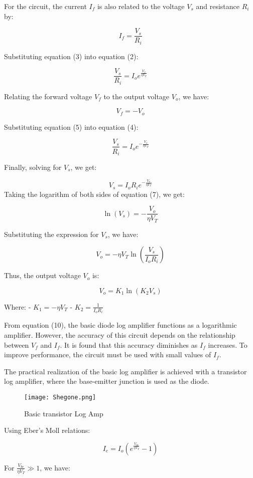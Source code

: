 \documentclass[a4paper,9pt,twoside,openany,twocolumn]{memoir}
\begin{document}
For the circuit, the current \( I_f \) is also related to the voltage \( V_s \) and resistance \( R_i \) by:

\[
I_f = \frac{V_s}{R_i} \tag{3}
\]

Substituting equation (3) into equation (2):

\[
\frac{V_s}{R_i} = I_o e^{\frac{V_f}{\eta V_T}} \tag{4}
\]

Relating the forward voltage \( V_f \) to the output voltage \( V_o \), we have:

\[
V_f = -V_o \tag{5}
\]

Substituting equation (5) into equation (4):

\[
\frac{V_s}{R_i} = I_o e^{-\frac{V_o}{\eta V_T}} \tag{6}
\]

Finally, solving for \( V_s \), we get:

\[
V_s = I_o R_i e^{-\frac{V_o}{\eta V_T}} \tag{7}
\]
Taking the logarithm of both sides of equation (7), we get:

\[
\ln(V_s) = -\frac{V_o}{\eta V_T} \tag{8}
\]

Substituting the expression for \( V_s \), we have:

\[
V_o = -\eta V_T \ln \left( \frac{V_s}{I_o R_i} \right) \tag{9}
\]

Thus, the output voltage \( V_o \) is:

\[
V_o = K_1 \ln(K_2 V_s) \tag{10}
\]

Where:
- \( K_1 = -\eta V_T \)
- \( K_2 = \frac{1}{I_o R_i} \)

From equation (10), the basic diode log amplifier functions as a logarithmic amplifier. However, the accuracy of this circuit depends on the relationship between \( V_f \) and \( I_f \). It is found that this accuracy diminishes as \( I_f \) increases. To improve performance, the circuit must be used with small values of \( I_f \).

The practical realization of the basic log amplifier is achieved with a transistor log amplifier, where the base-emitter junction is used as the diode.
\begin{figure}[H]
    \centering
    \texttt{[image: Shegone.png]}
    \caption{Basic transistor Log Amp}
    \label{fig:question_image}
\end{figure}
Using Eber's Moll relations:

\[
I_e = I_o \left( e^{\frac{V_{be}}{\eta V_T}} - 1 \right) \tag{1}
\]

For \( \frac{V_{be}}{\eta V_T} \gg 1 \), we have:
\end{document}
